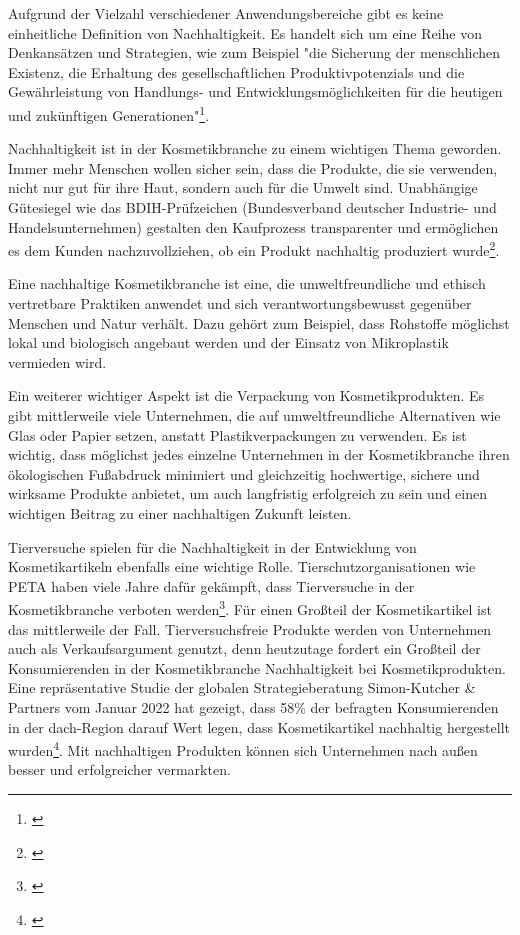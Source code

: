 Aufgrund der Vielzahl verschiedener Anwendungsbereiche gibt es keine einheitliche Definition von Nachhaltigkeit. Es handelt sich um eine Reihe von Denkansätzen und Strategien, wie zum Beispiel "die Sicherung der menschlichen Existenz, die Erhaltung des gesellschaftlichen Produktivpotenzials und die Gewährleistung von Handlungs- und Entwicklungsmöglichkeiten für die heutigen und zukünftigen Generationen"\footnote{\autocite [S. 18] {Pufe2017}}.
\newline

Nachhaltigkeit ist in der Kosmetikbranche zu einem wichtigen Thema geworden. Immer mehr Menschen wollen sicher sein, dass die Produkte, die sie verwenden, nicht nur gut für ihre Haut, sondern auch für die Umwelt sind. Unabhängige Gütesiegel wie das BDIH-Prüfzeichen (Bundesverband deutscher Industrie- und Handelsunternehmen) gestalten den Kaufprozess transparenter und ermöglichen es dem Kunden nachzuvollziehen, ob ein Produkt nachhaltig produziert wurde\footnote{\autocite [Online] {Flatley2021}}.
\newline

Eine nachhaltige Kosmetikbranche ist eine, die umweltfreundliche und ethisch vertretbare Praktiken anwendet und sich verantwortungsbewusst gegenüber Menschen und Natur verhält. Dazu gehört zum Beispiel, dass Rohstoffe möglichst lokal und biologisch angebaut werden und der Einsatz von Mikroplastik vermieden wird.
\newline

Ein weiterer wichtiger Aspekt ist die Verpackung von Kosmetikprodukten. Es gibt mittlerweile viele Unternehmen, die auf umweltfreundliche Alternativen wie Glas oder Papier setzen, anstatt Plastikverpackungen zu verwenden. Es ist wichtig, dass möglichst jedes einzelne Unternehmen in der Kosmetikbranche ihren ökologischen Fußabdruck minimiert und gleichzeitig hochwertige, sichere und wirksame Produkte anbietet, um auch langfristig erfolgreich zu sein und einen wichtigen Beitrag zu einer nachhaltigen Zukunft leisten.
\newline

Tierversuche spielen für die Nachhaltigkeit in der Entwicklung von Kosmetikartikeln ebenfalls eine wichtige Rolle. Tierschutzorganisationen wie PETA haben viele Jahre dafür gekämpft, dass Tierversuche in der Kosmetikbranche verboten werden\footnote{\autocite [Online] {PETA2021}}.
Für einen Großteil der Kosmetikartikel ist das mittlerweile der Fall. Tierversuchsfreie Produkte werden von Unternehmen auch als Verkaufsargument genutzt, denn heutzutage fordert ein Großteil der Konsumierenden in der Kosmetikbranche Nachhaltigkeit bei Kosmetikprodukten. Eine repräsentative Studie der globalen Strategieberatung Simon-Kutcher \& Partners vom Januar 2022 hat gezeigt, dass 58\% der befragten Konsumierenden in der \acs{dach}-Region darauf Wert legen, dass Kosmetikartikel nachhaltig hergestellt wurden\footnote{\autocite [Online] {Simon2021}}. Mit nachhaltigen Produkten können sich Unternehmen nach außen besser und erfolgreicher vermarkten.
\newline

